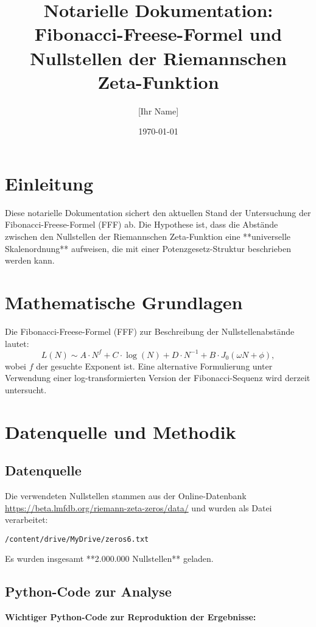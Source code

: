 \documentclass[a4paper,12pt]{article}
\title{Notarielle Dokumentation: Fibonacci-Freese-Formel und Nullstellen der Riemannschen Zeta-Funktion}
\author{[Ihr Name]}
\date{\today}
\begin{document}
\maketitle

\section{Einleitung}
Diese notarielle Dokumentation sichert den aktuellen Stand der Untersuchung der Fibonacci-Freese-Formel (FFF) ab. Die Hypothese ist, dass die Abstände zwischen den Nullstellen der Riemannschen Zeta-Funktion eine **universelle Skalenordnung** aufweisen, die mit einer Potenzgesetz-Struktur beschrieben werden kann.

\section{Mathematische Grundlagen}
Die Fibonacci-Freese-Formel (FFF) zur Beschreibung der Nullstellenabstände lautet:
\begin{equation}
L(N) \sim A \cdot N^f + C \cdot \log(N) + D \cdot N^{-1} + B \cdot J_0(\omega N + \phi),
\end{equation}
wobei \( f \) der gesuchte Exponent ist. Eine alternative Formulierung unter Verwendung einer log-transformierten Version der Fibonacci-Sequenz wird derzeit untersucht.

\section{Datenquelle und Methodik}

\subsection{Datenquelle}
Die verwendeten Nullstellen stammen aus der Online-Datenbank \url{https://beta.lmfdb.org/riemann-zeta-zeros/data/} und wurden als Datei verarbeitet:

\begin{verbatim}
/content/drive/MyDrive/zeros6.txt
\end{verbatim}

Es wurden insgesamt **2.000.000 Nullstellen** geladen.

\subsection{Python-Code zur Analyse}
\textbf{Wichtiger Python-Code zur Reproduktion der Ergebnisse:}
\end{document}
